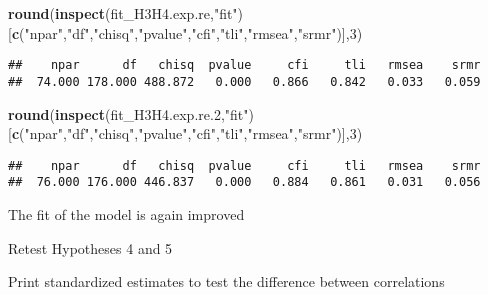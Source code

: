 \documentclass[
]{article}
\newenvironment{Shaded}{\begin{snugshade}}{\end{snugshade}}
\newcommand{\DecValTok}[1]{\textcolor[rgb]{0.00,0.00,0.81}{#1}}
\newcommand{\FloatTok}[1]{\textcolor[rgb]{0.00,0.00,0.81}{#1}}
\newcommand{\KeywordTok}[1]{\textcolor[rgb]{0.13,0.29,0.53}{\textbf{#1}}}
\newcommand{\NormalTok}[1]{#1}
\newcommand{\OperatorTok}[1]{\textcolor[rgb]{0.81,0.36,0.00}{\textbf{#1}}}
\newcommand{\StringTok}[1]{\textcolor[rgb]{0.31,0.60,0.02}{#1}}
\begin{document}
\begin{Shaded}
\begin{Highlighting}[]
\KeywordTok{round}\NormalTok{(}\KeywordTok{inspect}\NormalTok{(fit_H3H4.exp.re,}\StringTok{"fit"}\NormalTok{)}
\NormalTok{      [}\KeywordTok{c}\NormalTok{(}\StringTok{"npar"}\NormalTok{,}\StringTok{"df"}\NormalTok{,}\StringTok{"chisq"}\NormalTok{,}\StringTok{"pvalue"}\NormalTok{,}\StringTok{"cfi"}\NormalTok{,}\StringTok{"tli"}\NormalTok{,}\StringTok{"rmsea"}\NormalTok{,}\StringTok{"srmr"}\NormalTok{)],}\DecValTok{3}\NormalTok{)}
\end{Highlighting}
\end{Shaded}

\begin{verbatim}
##    npar      df   chisq  pvalue     cfi     tli   rmsea    srmr 
##  74.000 178.000 488.872   0.000   0.866   0.842   0.033   0.059
\end{verbatim}

\begin{Shaded}
\begin{Highlighting}[]
\KeywordTok{round}\NormalTok{(}\KeywordTok{inspect}\NormalTok{(fit_H3H4.exp.re}\FloatTok{.2}\NormalTok{,}\StringTok{"fit"}\NormalTok{)}
\NormalTok{      [}\KeywordTok{c}\NormalTok{(}\StringTok{"npar"}\NormalTok{,}\StringTok{"df"}\NormalTok{,}\StringTok{"chisq"}\NormalTok{,}\StringTok{"pvalue"}\NormalTok{,}\StringTok{"cfi"}\NormalTok{,}\StringTok{"tli"}\NormalTok{,}\StringTok{"rmsea"}\NormalTok{,}\StringTok{"srmr"}\NormalTok{)],}\DecValTok{3}\NormalTok{)}
\end{Highlighting}
\end{Shaded}

\begin{verbatim}
##    npar      df   chisq  pvalue     cfi     tli   rmsea    srmr 
##  76.000 176.000 446.837   0.000   0.884   0.861   0.031   0.056
\end{verbatim}

The fit of the model is again improved

Retest Hypotheses 4 and 5

Print standardized estimates to test the difference between correlations

\begin{Shaded}
\end{Shaded}
\end{document}
